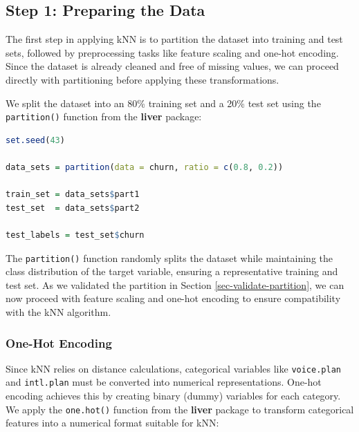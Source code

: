 \documentclass[
  11pt,
]{book}
\newcommand{\passthrough}[1]{#1}
\theoremstyle{definition}
\theoremstyle{definition}
\theoremstyle{definition}
\theoremstyle{definition}
\theoremstyle{remark}
\begin{document}
\subsection{Step 1: Preparing the Data}\label{step-1-preparing-the-data}

The first step in applying kNN is to partition the dataset into training and test sets, followed by preprocessing tasks like feature scaling and one-hot encoding. Since the dataset is already cleaned and free of missing values, we can proceed directly with partitioning before applying these transformations.

We split the dataset into an 80\% training set and a 20\% test set using the \passthrough{\lstinline!partition()!} function from the \textbf{liver} package:

\begin{lstlisting}[language=R]
set.seed(43)

data_sets = partition(data = churn, ratio = c(0.8, 0.2))

train_set = data_sets$part1
test_set  = data_sets$part2

test_labels = test_set$churn
\end{lstlisting}

The \passthrough{\lstinline!partition()!} function randomly splits the dataset while maintaining the class distribution of the target variable, ensuring a representative training and test set. As we validated the partition in Section \ref{sec-validate-partition}, we can now proceed with feature scaling and one-hot encoding to ensure compatibility with the kNN algorithm.

\subsubsection*{One-Hot Encoding}\label{one-hot-encoding-2}


Since kNN relies on distance calculations, categorical variables like \passthrough{\lstinline!voice.plan!} and \passthrough{\lstinline!intl.plan!} must be converted into numerical representations. One-hot encoding achieves this by creating binary (dummy) variables for each category. We apply the \passthrough{\lstinline!one.hot()!} function from the \textbf{liver} package to transform categorical features into a numerical format suitable for kNN:
\end{document}
